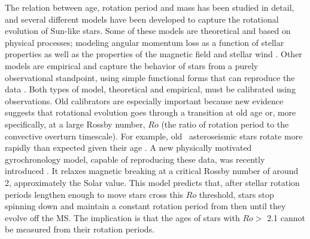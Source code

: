 The relation between age, rotation period and mass has been studied in detail,
and several different models have been developed to capture the rotational
evolution of Sun-like stars.
Some of these models are theoretical and based on physical processes; modeling
angular momentum loss as a function of stellar properties as well as the
properties of the magnetic field and stellar wind \citep{kawaler1988,
kawaler1989, vansaders2013, matt2015, vansaders2016}.
Other models are empirical and capture the behavior of stars from a purely
observational standpoint, using simple functional forms that can reproduce the
data \citep{barnes2003, barnes2007, mamajek2008, angus2015}.
Both types of model, theoretical and empirical, must be calibrated using
observations.
Old calibrators are especially important because new evidence suggests that
rotational evolution goes through a transition at old age or, more
specifically, at a large Rossby number, $Ro$ (the ratio of rotation period to
the convective overturn timescale).
For example, old \kepler\ asteroseismic stars rotate more rapidly than
expected given their age \citep[\eg][]{angus2015, vansaders2016}.
A new physically motivated gyrochronology model, capable of reproducing these
data, was recently introduced \citep{vansaders2016}.
It relaxes magnetic breaking at a critical Rossby number of around 2,
approximately the Solar value.
This model predicts that, after stellar rotation periods lengthen enough to
move stars cross this $Ro$ threshold, stars stop spinning down and maintain a
constant rotation period from then until they evolve off the MS.
The implication is that the ages of stars with $Ro >$ 2.1 cannot be measured
from their rotation periods.

